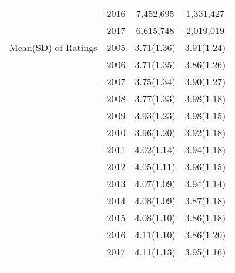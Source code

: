 \begin{table}[!htbp]
{\begin{tabular}{lccc}
                 & 2016                 &  7,452,695           &  1,331,427          \\
                 & 2017                 &  6,615,748          &   2,019,019          \\
Mean(SD) of Ratings & 2005              &  3.71(1.36)          &  3.91(1.24)           \\
                 & 2006              	&  3.71(1.35)          &  3.86(1.26)          \\
                 & 2007                 &  3.75(1.34)          &  3.90(1.27)          \\
                 & 2008                 &  3.77(1.33)          &  3.98(1.18)         \\
                 & 2009                 &  3.93(1.23)          &  3.98(1.15)          \\
                 & 2010                 &  3.96(1.20)          &  3.92(1.18)          \\
                 & 2011                 &  4.02(1.14)          &  3.94(1.18)          \\
                 & 2012                 &  4.05(1.11)          &  3.96(1.15)          \\
                 & 2013                 &  4.07(1.09)          &  3.94(1.14)          \\
                 & 2014                 &  4.08(1.09)          &  3.87(1.18)         \\
                 & 2015                 &  4.08(1.10)          &  3.86(1.18)          \\
                 & 2016                 &  4.11(1.10)          &  3.86(1.20)          \\
                 & 2017                 &  4.11(1.13)          &  3.95(1.16)           \\
                 &                  &                      &                      \\
                 &                  &                      &                      \\
                 
\end{tabular}%
}
\end{table}

